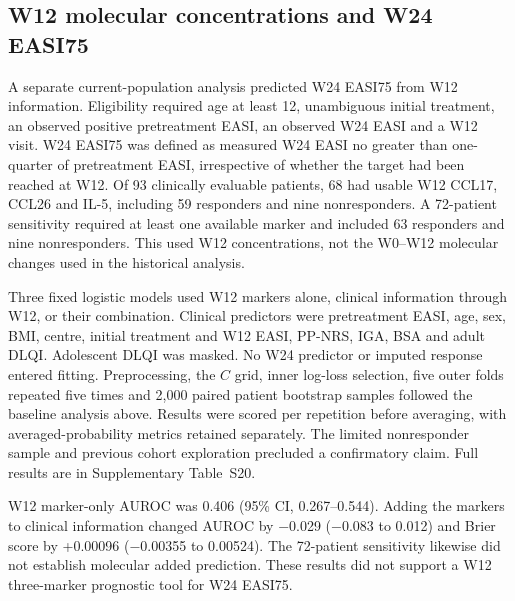 \subsection{W12 molecular concentrations and W24 EASI75}
A separate current-population analysis predicted W24 EASI75 from W12 information. Eligibility required age at least 12, unambiguous initial treatment, an observed positive pretreatment EASI, an observed W24 EASI and a W12 visit. W24 EASI75 was defined as measured W24 EASI no greater than one-quarter of pretreatment EASI, irrespective of whether the target had been reached at W12. Of 93 clinically evaluable patients, 68 had usable W12 CCL17, CCL26 and IL-5, including 59 responders and nine nonresponders. A 72-patient sensitivity required at least one available marker and included 63 responders and nine nonresponders. This used W12 concentrations, not the W0--W12 molecular changes used in the historical analysis.

Three fixed logistic models used W12 markers alone, clinical information through W12, or their combination. Clinical predictors were pretreatment EASI, age, sex, BMI, centre, initial treatment and W12 EASI, PP-NRS, IGA, BSA and adult DLQI. Adolescent DLQI was masked. No W24 predictor or imputed response entered fitting. Preprocessing, the $C$ grid, inner log-loss selection, five outer folds repeated five times and 2,000 paired patient bootstrap samples followed the baseline analysis above. Results were scored per repetition before averaging, with averaged-probability metrics retained separately. The limited nonresponder sample and previous cohort exploration precluded a confirmatory claim. Full results are in Supplementary Table~S20.

W12 marker-only AUROC was 0.406 (95\% CI, 0.267--0.544). Adding the markers to clinical information changed AUROC by $-$0.029 ($-$0.083 to 0.012) and Brier score by +0.00096 ($-$0.00355 to 0.00524). The 72-patient sensitivity likewise did not establish molecular added prediction. These results did not support a W12 three-marker prognostic tool for W24 EASI75.
